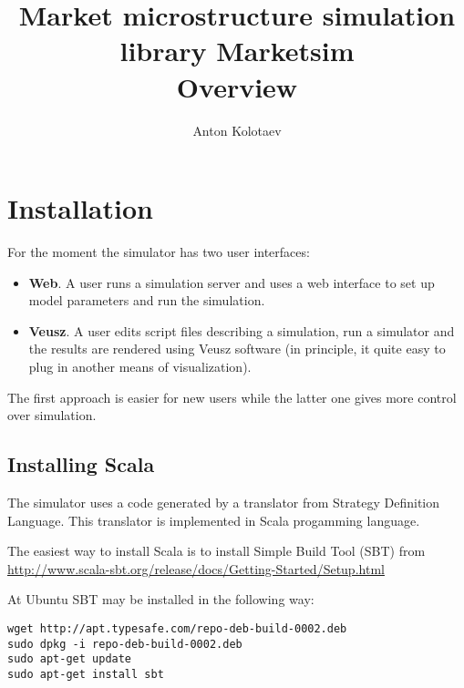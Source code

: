\documentclass[a4paper,11pt]{article}
\title{Market microstructure simulation library Marketsim\\Overview}
\author{Anton Kolotaev}
\begin{document}
\maketitle

\tableofcontents



















\newpage

\section{Installation}\label{installation}

For the moment the simulator has two user interfaces:

\begin{itemize}
\itemsep1pt\parskip0pt
\item
  \textbf{Web}. A user runs a simulation server and uses a web interface
  to set up model parameters and run the simulation.
\item
  \textbf{Veusz}. A user edits script files describing a simulation, run
  a simulator and the results are rendered using Veusz software (in
  principle, it quite easy to plug in another means of visualization).
\end{itemize}

The first approach is easier for new users while the latter one gives
more control over simulation.

\subsection{Installing Scala}\label{installing-scala}

The simulator uses a code generated by a translator from Strategy
Definition Language. This translator is implemented in Scala progamming
language. 

The easiest way to install Scala is to install Simple Build Tool (SBT)
from
\url{http://www.scala-sbt.org/release/docs/Getting-Started/Setup.html}

At Ubuntu SBT may be installed in the following way:

\begin{verbatim}
wget http://apt.typesafe.com/repo-deb-build-0002.deb
sudo dpkg -i repo-deb-build-0002.deb
sudo apt-get update
sudo apt-get install sbt
\end{verbatim}
\end{document}
